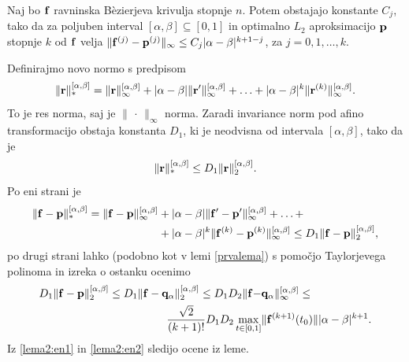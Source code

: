 \begin{lema}\label{drugalema}
Naj bo ${\bf f}$ ravninska B\`{e}zierjeva krivulja stopnje $n$. Potem obstajajo konstante $C_{j}$, tako da za poljuben interval $[\alpha,\beta]\subseteq[0,1]$ in optimalno $L_2$ aproksimacijo ${\bf p}$ stopnje $k$ od ${\bf f}$ velja
$\lVert {\bf f}^{(j)} - {\bf p}^{(j)} \rVert _{\infty} \leq C_{j}|\alpha - \beta|^{k+1-j}$, za $j=0,1,\ldots,k$. 
\end{lema}
\proof
Definirajmo novo normo s predpisom
$$
\lVert {\bf r}\rVert _{*}^{[\alpha,\beta]} = \lVert {\bf r}\rVert _\infty^{[\alpha,\beta]} + |\alpha - \beta|\lVert {\bf r}'\rVert _\infty^{[\alpha,\beta]} + \ldots + 
 |\alpha - \beta|^k\lVert {\bf r}^{(k)}\rVert _\infty^{[\alpha,\beta]}.
$$
To je res norma, saj je $\lVert \,\cdot\, \rVert _\infty$ norma. Zaradi invariance norm pod afino transformacijo obstaja konstanta $D_1$, ki je neodvisna od intervala $[\alpha,\beta]$, tako da je 
$$
\lVert {\bf r}\rVert _{*}^{[\alpha,\beta]} \leq D_1 \lVert {\bf r}\rVert _{2}^{[\alpha,\beta]}.
$$
Po eni strani je
\begin{equation}\label{lema2:en1}
\begin{split}
\lVert {\bf f} - {\bf p}\rVert _{*}^{[\alpha,\beta]}  =  \lVert {\bf f} - {\bf p}\rVert _\infty^{[\alpha,\beta]}  &+  |\alpha - \beta|\lVert {\bf f}' - {\bf p}'\rVert _\infty^{[\alpha,\beta]} + \ldots +\\ 
   & +  |\alpha - \beta|^k\lVert {\bf f}^{(k)} - {\bf p}^{(k)}\rVert _\infty^{[\alpha,\beta]} \leq 
 D_1 \lVert {\bf f} - {\bf p}\rVert _{2}^{[\alpha,\beta]},
 \end{split}
\end{equation}
po drugi strani lahko (podobno kot v lemi \ref{prvalema}) s pomočjo Taylorjevega polinoma in izreka o ostanku ocenimo
\begin{equation}\label{lema2:en2}
\begin{split}
D_1 \lVert {\bf f} - {\bf p}\rVert _{2}^{[\alpha,\beta]} \leq 
D_1 \lVert {\bf f} - {\bf q}_\alpha\rVert _{2}^{[\alpha,\beta]} \leq 
D_1D_2 \lVert {\bf f} - &{\bf q}_\alpha\rVert _{\infty}^{[\alpha,\beta]} \leq \\
\frac{\sqrt{2}}{(k+1)!}  D_1D_2\max _{t\in [0,1]}& \lVert {\bf f}^{(k+1)}(t_0) \rVert |\alpha - \beta|^{k+1}.
\end{split}
\end{equation}
\endproof
Iz \ref{lema2:en1} in \ref{lema2:en2} sledijo ocene iz leme.

